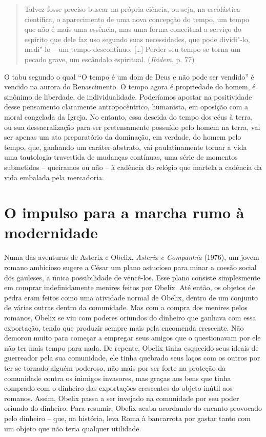 \begin{quote}
Talvez fosse preciso buscar na própria ciência, ou seja, na escolástica
científica, o aparecimento de uma nova concepção do tempo, um tempo que
não é mais uma essência, mas uma forma conceitual a serviço do espírito
que dele faz uso segundo suas necessidades, que pode dividi"-lo, medi"-lo
-- um tempo descontínuo. [\ldots{}] Perder seu tempo se torna um
pecado grave, um escândalo espiritual. (\emph{Ibidem}, p. 77)
\end{quote}

O tabu segundo o qual ``O tempo é um dom de Deus e não pode ser
vendido'' é vencido na aurora do Renascimento. O tempo agora é
propriedade do homem, é sinônimo de liberdade, de individualidade.
Poderíamos apostar na positividade desse pensamento claramente
antropocêntrico, humanista, em oposição com a moral congelada da Igreja.
No entanto, essa descida do tempo dos céus à terra, ou sua
dessacralização para ser pretensamente possuído pelo homem na terra, vai
ser apenas um ato preparatório da dominação, em verdade, do homem pelo
tempo, que, ganhando um caráter abstrato, vai paulatinamente tornar a
vida uma tautologia travestida de mudanças contínuas, uma série de
momentos submetidos -- queiramos ou não -- à cadência do relógio que
martela a cadência da vida embalada pela mercadoria.

\section{O impulso para a marcha rumo à modernidade}

Numa das aventuras de Asterix e Obelix, \emph{Asterix e Companhia}
(1976), um jovem romano ambicioso sugere a César um plano astucioso para
minar a coesão social dos gauleses, a única possibilidade de vencê-los.
Esse plano consiste simplesmente em comprar indefinidamente menires
feitos por Obelix. Até então, os objetos de pedra eram feitos como uma
atividade normal de Obelix, dentro de um conjunto de várias outras
dentro da comunidade. Mas com a compra dos menires pelos romanos, Obelix
se viu com poderes oriundos do dinheiro que ganhava com essa exportação,
tendo que produzir sempre mais pela encomenda crescente. Não demorou
muito para começar a empregar seus amigos que o questionavam por ele não
ter mais tempo para nada. De repente, Obelix tinha esquecido seus ideais
de guerreador pela sua comunidade, ele tinha quebrado seus laços com os
outros por ter se tornado alguém poderoso, não mais por ser forte na
proteção da comunidade contra os inimigos invasores, mas graças aos bens
que tinha comprado com o dinheiro das exportações crescentes do objeto
inútil aos romanos. Assim, Obelix passa a ser invejado na comunidade por
seu poder oriundo do dinheiro. Para resumir, Obelix acaba acordando do
encanto provocado pelo dinheiro -- que, na história, leva Roma à
bancarrota por gastar tanto com um objeto que não teria qualquer
utilidade.

